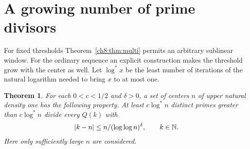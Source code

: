 \documentclass[11pt,a4paper,oneside,openany]{report}
\newtheorem{theorem}{Theorem}[section]
\theoremstyle{remark}\newtheorem{remark}[theorem]{Remark}
\numberwithin{equation}{section}
\begin{document}
\section{A growing number of prime divisors}\label{ch8:sec:grow}
For fixed thresholds Theorem~\ref{ch8:thm:multi} permits an arbitrary sublinear window. For the ordinary sequence an explicit construction makes the threshold grow with the center as well. Let $\log^*x$ be the least number of iterations of the natural logarithm needed to bring $x$ to at most one.
\begin{theorem}\label{ch8:thm:logstar}
For each $0<c<1/2$ and $\delta>0$, a set of centers $n$ of upper natural density one has the following property. At least $c\log^* n$ distinct primes greater than $c\log^* n$ divide every $Q(k)$ with
\[
                    |k-n|\le n/(\log\log n)^\delta,\qquad k\in\mathbb N.
\]
Here only sufficiently large $n$ are considered.
\end{theorem}
\end{document}

